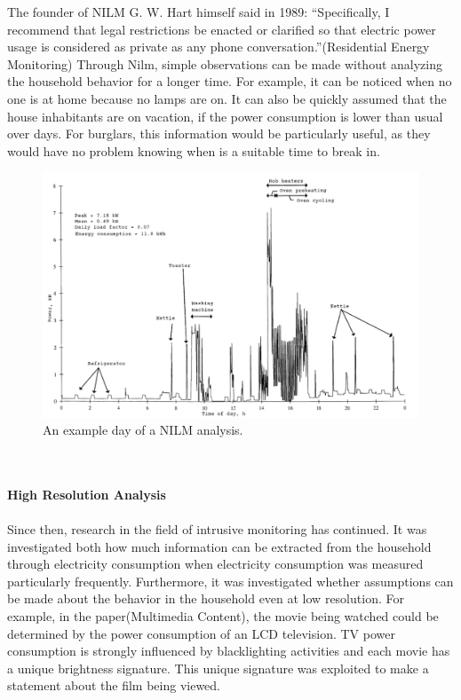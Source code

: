The founder of NILM G. W. Hart himself said in 1989: ``Specifically, I recommend that legal restrictions be enacted or clarified so that electric power usage is considered as private as any phone conversation.''(Residential Energy Monitoring)
Through Nilm, simple observations can be made without analyzing the household behavior for a longer time. For example, it can be noticed when no one is at home because no lamps are on. It can also be quickly assumed that the house inhabitants are on vacation, if the power consumption is lower than usual over days. For burglars, this information would be particularly useful, as they would have no problem knowing when is a suitable time to break in.
\begin{figure}[tbp]
  \centering
  \includegraphics[width=1\textwidth]{images/nilm.png}
  \caption[Short description]{An example day of a NILM analysis.}
  \label{fig:Nilm}
\end{figure}
\\
\\
\textbf{High Resolution Analysis}
\\
\\
Since then, research in the field of intrusive monitoring has continued. It was investigated both how much information can be extracted from the household through electricity consumption when electricity consumption was measured particularly frequently. Furthermore, it was investigated whether assumptions can be made about the behavior in the household even at low resolution.
For example, in the paper(Multimedia Content), the movie being watched could be determined by the power consumption of an LCD television. TV power consumption is strongly influenced by blacklighting activities and each movie has a unique brightness signature. This unique signature was exploited to make a statement about the film being viewed.

